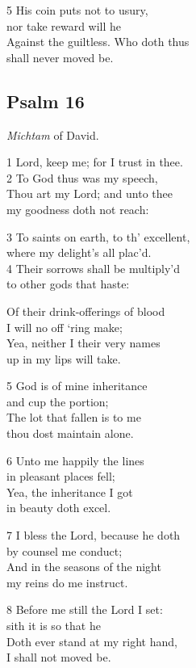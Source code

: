 \begin{multicols}{3}
5 His coin puts not to usury,\\
nor take reward will he\\
Against the guiltless. Who doth thus\\
shall never moved be.

\begin{center}
\quad{}\quad{}
\end{center}

\subsection*{Psalm 16}

\emph{Michtam} of David.

1 Lord, keep me; for I trust in thee.\\
2 To God thus was my speech,\\
Thou art my Lord; and unto thee\\
my goodness doth not reach:

3 To saints on earth, to th’ excellent,\\
where my delight’s all plac’d.\\
4 Their sorrows shall be multiply’d\\
to other gods that haste:

Of their drink-offerings of blood\\
I will no off ‘ring make;\\
Yea, neither I their very names\\
up in my lips will take.

5 God is of mine inheritance\\
and cup the portion;\\
The lot that fallen is to me\\
thou dost maintain alone.

6 Unto me happily the lines\\
in pleasant places fell;\\
Yea, the inheritance I got\\
in beauty doth excel.

7 I bless the Lord, because he doth\\
by counsel me conduct;\\
And in the seasons of the night\\
my reins do me instruct.

8 Before me still the Lord I set:\\
sith it is so that he\\
Doth ever stand at my right hand,\\
I shall not moved be.


\end{multicols}
